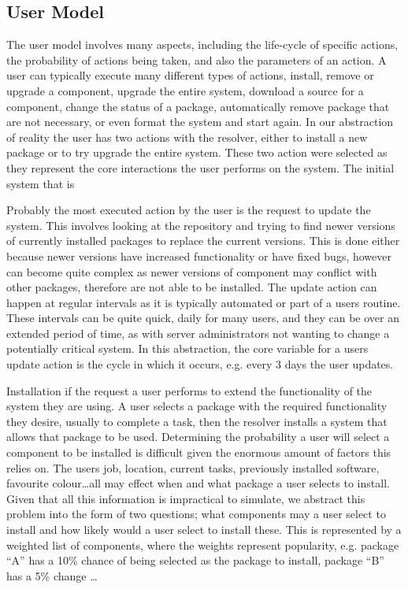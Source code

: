 \subsection{User Model}
The user model involves many aspects, including the life-cycle of specific actions, the probability of actions being taken, and also the parameters of an action.
A user can typically execute many different types of actions, install, remove or upgrade a component, upgrade the entire system,
download a source for a component, change the status of a package, automatically remove package that are not necessary, or even format the system and start again.
In our abstraction of reality the user has two actions with the resolver, either to install a new package or to try upgrade the entire system.
These two action were selected as they represent the core interactions the user performs on the system.
The initial system that is 

Probably the most executed action by the user is the request to update the system.
This involves looking at the repository and trying to find newer versions of currently installed packages to replace the current versions.
This is done either because newer versions have increased functionality or have fixed bugs,
however can become quite complex as newer versions of component may conflict with other packages, therefore are not able to be installed.
The update action can happen at regular intervals as it is typically automated or part of a users routine.
These intervals can be quite quick, daily for many users, 
and they can be over an extended period of time, 
as with server administrators not wanting to change a potentially critical system.
In this abstraction, the core variable for a users update action is the cycle in which it occurs,
e.g. every 3 days the user updates.

Installation if the request a user performs to extend the functionality of the system they are using.
A user selects a package with the required functionality they desire, usually to complete a task,
then the resolver installs a system that allows that package to be used.
Determining the probability a user will select a component to be installed is difficult given the enormous amount of factors this relies on.
The users job, location, current tasks, previously installed software, favourite colour\ldots all may effect when and what package a user selects to install.
Given that all this information is impractical to simulate, we abstract this problem into the form of two questions;
what components may a user select to install and how likely would a user select to install these.
This is represented by a weighted list of components, where the weights represent popularity,
e.g. package ``A'' has a 10\% chance of being selected as the package to install, package ``B'' has a 5\% change \ldots

